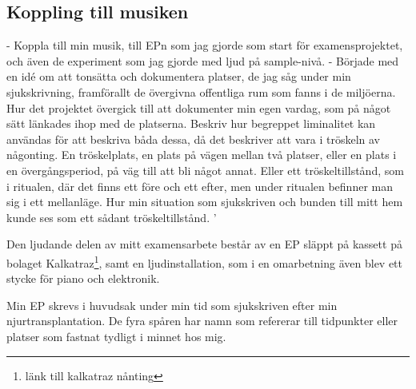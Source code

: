 \documentclass{article}
\begin{document}



\subsection{Koppling till musiken}
- Koppla till min musik, till EPn som jag gjorde som start för examensprojektet, och även de experiment som
  jag gjorde med ljud på sample-nivå. 
- Började med en idé om att tonsätta och dokumentera platser, de jag såg under min sjukskrivning, framförallt
  de övergivna offentliga rum som fanns i de miljöerna. Hur det projektet övergick till att dokumenter min
  egen vardag, som på något sätt länkades ihop med de platserna. Beskriv hur begreppet liminalitet kan
  användas för att beskriva båda dessa, då det beskriver att vara i tröskeln av någonting. En tröskelplats, en
  plats på vägen mellan två platser, eller en plats i en övergångsperiod, på väg till att bli något annat.
  Eller ett tröskeltillstånd, som i ritualen, där det finns ett före och ett efter, men under ritualen
  befinner man sig i ett mellanläge. Hur min situation som sjukskriven och bunden till mitt hem kunde ses som
  ett sådant tröskeltillstånd. '

  Den ljudande delen av mitt examensarbete består av en EP släppt på kassett på bolaget
  Kalkatraz\footnote{länk till kalkatraz nånting}, samt en ljudinstallation, som i en omarbetning även blev
  ett stycke för piano och elektronik.

  Min EP skrevs i huvudsak under min tid som sjukskriven efter min njurtransplantation. De fyra spåren har
  namn som refererar till tidpunkter eller platser som fastnat tydligt i minnet hos mig. 
\end{document}
